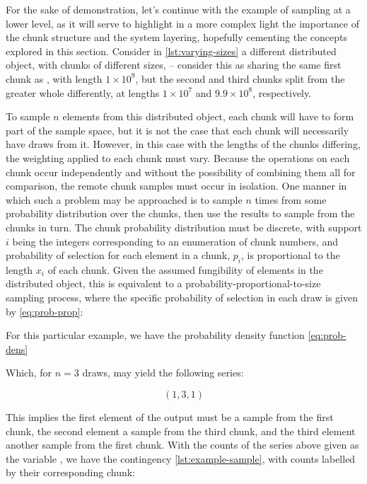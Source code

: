 For the sake of demonstration, let's continue with the example of sampling at a lower level, as it will serve to highlight in a more complex light the importance of the chunk structure and the system layering, hopefully cementing the concepts explored in this section.
Consider in \cref{lst:varying-sizes} a different distributed object, with chunks of different sizes,  -- consider this as sharing the same first chunk as , with length \(1 \times 10^9\), but the second and third chunks split from the greater whole differently, at lengths \(1 \times 10^7\) and \(9.9 \times 10^8\), respectively.


To sample \(n\) elements from this distributed object, each chunk will have to form part of the sample space, but it is not the case that each chunk will necessarily have draws from it.
However, in this case with the lengths of the chunks differing, the weighting applied to each chunk must vary.
Because the operations on each chunk occur independently and without the possibility of combining them all for comparison, the remote chunk samples must occur in isolation.
One manner in which such a problem may be approached is to sample \(n\) times from some probability distribution over the chunks, then use the results to sample from the chunks in turn.
The chunk probability distribution must be discrete, with support \(i\) being the integers corresponding to an enumeration of chunk numbers, and probability of selection for each element in a chunk, \(p_i\), is proportional to the length \(x_i\) of each chunk.
Given the assumed fungibility of elements in the distributed object, this is equivalent to a probability-proportional-to-size sampling process, where the specific probability of selection in each draw is given by \cref{eq:prob-prop}:


For this particular example, we have the probability density function \cref{eq:prob-dens}


Which, for \(n=3\) draws, may yield the following series:

\[ (1, 3, 1) \]

This implies the first element of the output must be a sample from the first chunk, the second element a sample from the third chunk, and the third element another sample from the first chunk.
With the counts of the series above given as the variable , we have the contingency \cref{lst:example-sample}, with counts labelled by their corresponding chunk:

